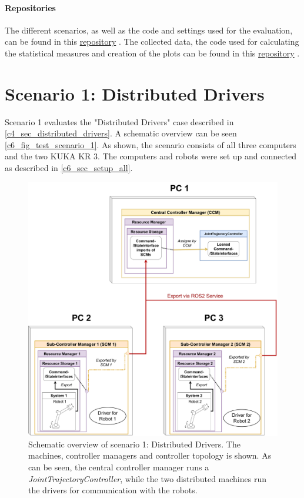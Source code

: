 \paragraph{Repositories}
The different scenarios, as well as the code and settings used for the evaluation, can be found in this  \href{https://github.com/StoglRobotics-forks/ma_demos}{repository} \cite{noauthor_ma_demos_2023}.\newline
The collected data, the code used for calculating the statistical measures and creation of the plots can be found in this \href{https://github.com/mamueluth/ma_evaluation}{repository} \cite{muth_mamueluthma_evaluation_2023}.

\section{Scenario 1: Distributed Drivers}
Scenario 1 evaluates the "Distributed Drivers" case described in \autoref{c4_sec_distributed_drivers}. A schematic overview can be seen \autoref{c6_fig_test_scenario_1}. As shown, the scenario consists of all three computers and the two KUKA KR 3. The computers and robots were set up and connected as described in \autoref{c6_sec_setup_all}.\newline
\begin{figure}[H]
	\centering
	\includegraphics[width=1\textwidth]{Figures/c6/test_scenario_1.pdf}
	\caption{Schematic overview of scenario 1: Distributed Drivers. The machines, controller managers and controller topology is shown. As can be seen, the central controller manager runs a \textit{JointTrajectoryController}, while the two distributed machines run the drivers for communication with the robots. }
	\label{c6_fig_test_scenario_1}
\end{figure}
